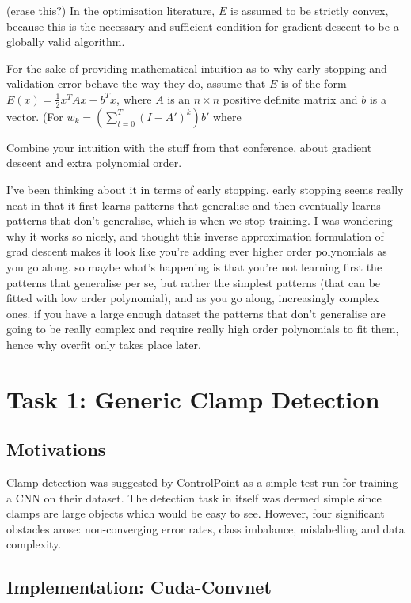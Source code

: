 \documentclass[a4paper,11pt]{article}
\begin{document}
(erase this?) In the optimisation literature, $E$ is assumed to be strictly convex, because this is the necessary and sufficient condition for gradient descent to be a globally valid algorithm. 

For the sake of providing mathematical intuition as to why early stopping and validation error behave the way they do, assume that $E$ is of the form $E(x) = \frac{1}{2}x^T Ax - b^T x$, where $A$ is an $n \times n$ positive definite matrix and $b$ is a vector. (For 
$ w_k = ( \sum_{t=0}^{T} (I - A')^k)b'$ where 



Combine your intuition with the stuff from that conference, about gradient descent and extra polynomial order.

I've been thinking about it in terms of early stopping. early stopping seems really neat in that it first learns patterns that generalise and then eventually learns patterns that don't generalise, which is when we stop training. I was wondering why  it works so nicely, and thought this inverse approximation formulation of grad descent makes it look like you're adding ever higher order polynomials as you go along. so maybe what's happening is that you're not learning first the patterns that generalise per se, but rather the simplest patterns (that can be fitted with low order polynomial), and as you go along, increasingly complex ones. if you have a large enough dataset the patterns that don't generalise are going to be really complex and require really high order polynomials to fit them, hence why overfit only takes place later.

\section{Task 1: Generic Clamp Detection}


\subsection{Motivations}

Clamp detection was suggested by ControlPoint as a simple test run for training a CNN on their dataset. The detection task in itself was deemed simple since clamps are large objects which would be easy to see. However, four significant obstacles arose: non-converging error rates, class imbalance, mislabelling and data complexity.\\


\subsection{Implementation: Cuda-Convnet}
\end{document}
